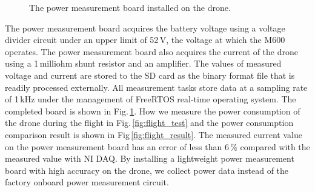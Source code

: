 \documentclass[journal]{./template/IEEEtran}
\begin{document}
\begin{figure}[ht]
\caption{The power measurement board installed on the drone.}
\label{fig:board}
\end{figure}

The power measurement board acquires the battery voltage using a voltage divider circuit under an upper limit of 52\,V, the voltage at which the M600 operates. 
The power measurement board also acquires the current of the drone using a 1\,milliohm shunt resistor and an amplifier.
The values of measured voltage and current are stored to the SD card as the binary format file that is readily processed externally.
All measurement tasks store data at a sampling rate of 1\,kHz under the management of FreeRTOS real-time operating system.
The completed board is shown in Fig.\,\ref{fig:board}.
How we measure the power consumption of the drone during the flight in Fig.\,\ref{fig:flight_test} and the power consumption comparison result is shown in Fig\,\ref{fig:flight_result}.
The measured current value on the power measurement board has an error of less than 6\,\% compared with the measured value with NI DAQ. 
By installing a lightweight power measurement board with high accuracy on the drone, we collect power data instead of the factory onboard power measurement circuit.
\end{document}
